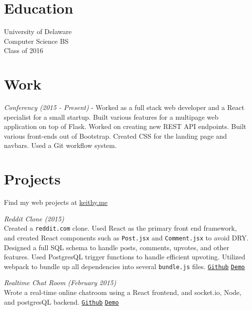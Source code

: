 \documentclass[margin]{res}
\begin{document}

\address{{\bf Address}\\346 Nicholas Ct \\Wilmington, DE 19808\\(302) 887-0387}
\address{{\bf Links}\\\url{terda12@gmail.com}\\\url{github.com/keithyong}\\\url{keithy.me}}

\begin{resume}

\section{Education}
University of Delaware\\
Computer Science BS\\
Class of 2016\\

\section{Work}
\textit{Conferency (2015 - Present)} - Worked as a full stack web developer and a React specialist for a small startup. Built various features for a multipage web application on top of Flask. Worked on creating new REST API endpoints. Built various front-ends out of Bootstrap. Created CSS for the landing page and navbars. Used a Git workflow system.

\section{Projects}

Find my web projects at \url{keithy.me}

\textit{Reddit Clone (2015)}\\ Created a \texttt{reddit.com} clone. Used React as the primary front end framework, and created React components such as \texttt{Post.jsx} and \texttt{Comment.jsx} to avoid DRY. Designed a full SQL schema to handle posts, comments, upvotes, and other features. Used PostgresQL trigger functions to handle efficient upvoting. Utilized webpack to bundle up all dependencies into several \texttt{bundle.js} files. \underline{\texttt{\href{https://github.com/keithyong/pyramus}{Github}}} \underline{\texttt{\href{http://pyramus.keithy.me}{Demo}}}

\textit{Realtime Chat Room (February 2015)}\\ Wrote a real-time online chatroom using a React frontend, and socket.io, Node, and postgresQL backend. \underline{\texttt{\href{https://github.com/keithyong/chat-room}{Github}}} \underline{\texttt{\href{http://chatter.keithy.me}{Demo}}}


\end{resume}
\end{document}
